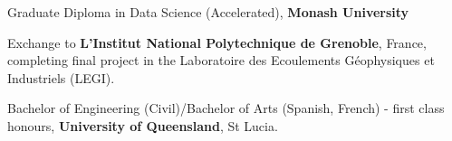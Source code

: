 %
%
%


\begin{scholarship}

					{Graduate Diploma in Data Science (Accelerated), \textbf{Monash University}}

					{Exchange to \textbf{L'Institut National Polytechnique de Grenoble}, France, completing final project in the Laboratoire des Ecoulements Géophysiques et Industriels (LEGI).}
					
					{Bachelor of Engineering (Civil)/Bachelor of Arts (Spanish, French) - first class honours, \textbf{University of Queensland}, St Lucia.}

\end{scholarship}